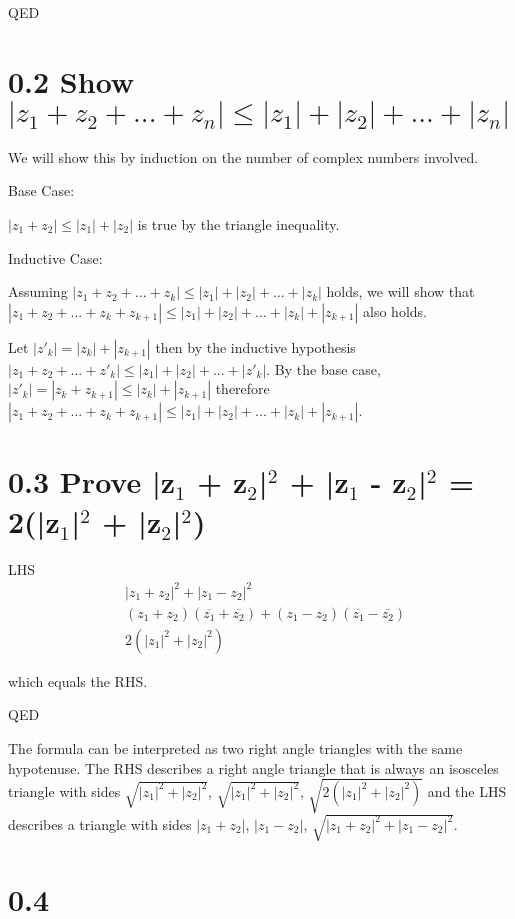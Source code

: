 \documentclass[11pt]{article}
\begin{document}
QED

\section*{0.2 Show \(|z_1 + z_2 + ... + z_n| \leq |z_1| + |z_2| + ... + |z_n|\)}
\label{sec:org9d0bb7a}
We will show this by induction on the number of complex numbers involved.

Base Case:

\(|z_1 + z_2| \leq |z_1| + |z_2|\) is true by the triangle inequality.

Inductive Case:

Assuming \(|z_1 + z_2 + ... + z_k| \leq |z_1| + |z_2| + ... + |z_k|\) holds, we will show that \(|z_1 + z_2 + ... + z_k + z_{k+1}| \leq |z_1| + |z_2| + ... + |z_k| + |z_{k+1}|\) also holds.

Let \(|z'_k| = |z_k| + |z_{k+1}|\) then by the inductive hypothesis \(|z_1 + z_2 + ... + z'_k| \leq |z_1| + |z_2| + ... + |z'_k|\). By the base case, \(|z'_k| = |z_k + z_{k+1}| \leq |z_k| + |z_{k+1}|\) therefore \(|z_1 + z_2 + ... + z_k + z_{k+1}| \leq |z_1| + |z_2| + ... + |z_k| + |z_{k+1}|\).

\section*{0.3 Prove |z\(_{\text{1}}\) + z\(_{\text{2}}\)|\(^{\text{2}}\) + |z\(_{\text{1}}\) - z\(_{\text{2}}\)|\(^{\text{2}}\) = 2(|z\(_{\text{1}}\)|\(^{\text{2}}\) + |z\(_{\text{2}}\)|\(^{\text{2}}\))}
\label{sec:org9c7dbae}
LHS
\begin{align*}
& |z_1 + z_2|^2 + |z_1 - z_2|^2 \\
& (z_1 + z_2)(\overline{z_1} + \overline{z_2}) + (z_1 - z_2)(\overline{z_1} - \overline{z_2}) \\
& 2(|z_1|^2 + |z_2|^2)
\end{align*}

which equals the RHS.

QED

The formula can be interpreted as two right angle triangles with the same hypotenuse. The RHS describes a right angle triangle that is always an isosceles triangle with sides \(\sqrt{|z_1|^2 + |z_2|^2}\), \(\sqrt{|z_1|^2 + |z_2|^2}\), \(\sqrt{2(|z_1|^2 + |z_2|^2)}\) and the LHS describes a triangle with sides \(|z_1 + z_2|\), \(|z_1 - z_2|\), \(\sqrt{|z_1 + z_2|^2 + |z_1 - z_2|^2}\).

\section*{0.4}
\label{sec:org6468853}
\end{document}
